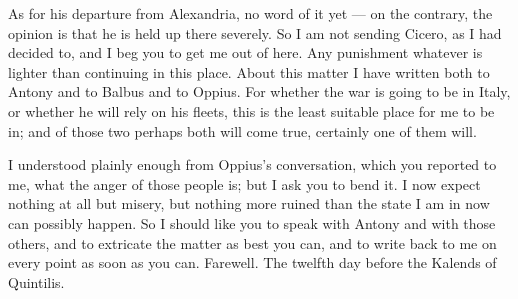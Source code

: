 

 As for his departure from Alexandria, no word of it yet --- on the contrary, the opinion is that he is held up there severely. So I am not sending Cicero, as I had decided to, and I beg you to get me out of here. Any punishment whatever is lighter than continuing in this place. About this matter I have written both to Antony and to Balbus and to Oppius. For whether the war is going to be in Italy, or whether he will rely on his fleets, this is the least suitable place for me to be in; and of those two perhaps both will come true, certainly one of them will.

 I understood plainly enough from Oppius's conversation, which you reported to me, what the anger of those people is; but I ask you to bend it. I now expect nothing at all but misery, but nothing more ruined than the state I am in now can possibly happen. So I should like you to speak with Antony and with those others, and to extricate the matter as best you can, and to write back to me on every point as soon as you can. Farewell. The twelfth day before the Kalends of Quintilis.
